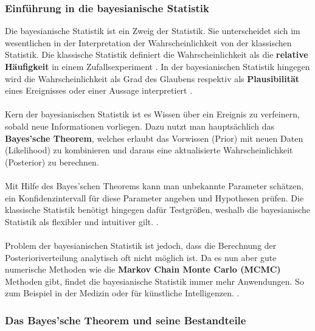 \documentclass[a4paper,12pt]{article}
\begin{document}
\subsubsection{Einführung in die bayesianische Statistik}

Die bayesianische Statistik ist ein Zweig der Statistik. Sie unterscheidet sich im wesentlichen in der Interpretation der Wahrscheinlichkeit von der klassischen Statistik. Die klassische Statistik definiert die Wahrscheinlichkeit als die \textbf{relative Häufigkeit} in einem Zufallsexperiment \parencite[2]{StatistikKlassischOderBayes}. In der bayesianischen Statistik hingegen wird die Wahrscheinlichkeit als Grad des Glaubens respektiv als \textbf{Plausibilität} eines Ereignisses oder einer Aussage interpretiert \parencite[1]{EinfBayesStatistik}. \\\\
Kern der bayesianischen Statistik ist es Wissen über ein Ereignis zu verfeinern, sobald neue Informationen vorliegen. Dazu nutzt man hauptsächlich das \textbf{Bayes'sche Theorem}, welches erlaubt das Vorwissen (Prior) mit neuen Daten (Likelihood) zu kombinieren und daraus eine aktualisierte Wahrscheinlichkeit (Posterior) zu berechnen. \\\\
Mit Hilfe des Bayes'schen Theorems kann man unbekannte Parameter schätzen, ein Konfidenzintervall für diese Parameter angeben und Hypothesen prüfen. Die klassische Statistik benötigt hingegen dafür Testgrößen, weshalb die bayesianische Statistik als flexibler und intuitiver gilt. \parencite[1]{EinfBayesStatistik}. \\\\
Problem der bayesianischen Statistik ist jedoch, dass die Berechnung der Posterioriverteilung analytisch oft nicht möglich ist. Da es nun aber gute numerische Methoden wie die \textbf{Markov Chain Monte Carlo (MCMC)} Methoden gibt, findet die bayesianische Statistik immer mehr Anwendungen. So zum Beispiel in der Medizin oder für künstliche Intelligenzen. \parencite[1]{StatistikKlassischOderBayes}.

\subsubsection{Das Bayes'sche Theorem und seine Bestandteile}
\end{document}
